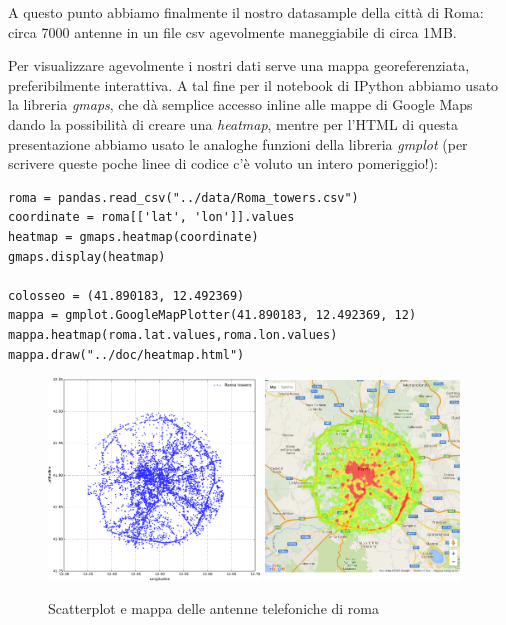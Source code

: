 A questo punto abbiamo finalmente il nostro datasample della città di Roma: circa 7000 antenne in un file csv agevolmente maneggiabile di circa 1MB.

Per visualizzare agevolmente i nostri dati serve una mappa georeferenziata, preferibilmente interattiva. A tal fine per il notebook di IPython abbiamo usato la libreria \emph{gmaps}, che dà semplice accesso inline alle mappe di Google Maps dando la possibilità di creare una \emph{heatmap}, mentre per l'HTML di questa presentazione abbiamo usato le analoghe funzioni della libreria \emph{gmplot} (per scrivere queste poche linee di codice c'è voluto un intero pomeriggio!):

\begin{lstlisting}
roma = pandas.read_csv("../data/Roma_towers.csv")
coordinate = roma[['lat', 'lon']].values
heatmap = gmaps.heatmap(coordinate)
gmaps.display(heatmap)

colosseo = (41.890183, 12.492369)
mappa = gmplot.GoogleMapPlotter(41.890183, 12.492369, 12)
mappa.heatmap(roma.lat.values,roma.lon.values)
mappa.draw("../doc/heatmap.html")
\end{lstlisting}
\begin{figure}[b!]
	\centering
	\subfloat
	{\includegraphics[width=0.5\textwidth]{./Immagini/Dati/roma}}
	\subfloat
	{\includegraphics[width=0.46\textwidth]{./Immagini/Dati/Ourmap.png}}
	\caption[Plot antenne.]{Scatterplot e mappa delle antenne telefoniche di roma}
	\label{fig:maps}
\end{figure}

